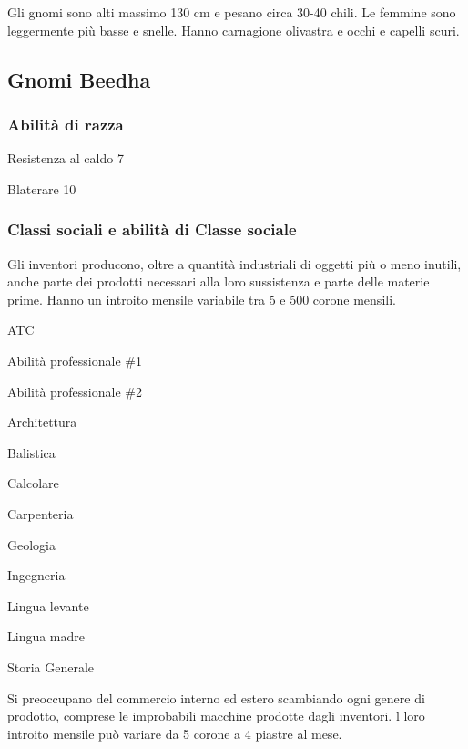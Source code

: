 \Fisico Gli gnomi sono alti massimo 130 cm e pesano circa 30-40 chili.
Le femmine sono leggermente pi\`u basse e snelle. Hanno carnagione
olivastra e occhi e capelli scuri.

\subsection{Gnomi Beedha}

\minmaxgnomi

\subsubsection{Abilit\`a di razza}

\begin{abilist}
\item Resistenza al caldo 7
\item Blaterare 10
\end{abilist}

\subsubsection{Classi sociali e abilit\`a di Classe sociale}


Gli inventori producono, oltre a quantit\`a industriali di oggetti
pi\`u o meno inutili, anche parte dei prodotti necessari alla loro
sussistenza e parte delle materie prime. Hanno un introito mensile
variabile tra 5 e 500 corone mensili.

\begin{abilist}
\item ATC 
\item Abilit\`a professionale \#1
\item Abilit\`a professionale \#2
\item Architettura
\item Balistica
\item Calcolare
\item Carpenteria
\item Geologia
\item Ingegneria
\item Lingua levante
\item Lingua madre
\item Storia Generale
\end{abilist}


Si preoccupano del commercio interno ed estero scambiando ogni genere
di prodotto, comprese le improbabili macchine prodotte dagli
inventori. l loro introito mensile pu\`o variare da 5 corone a 4
piastre al mese.

